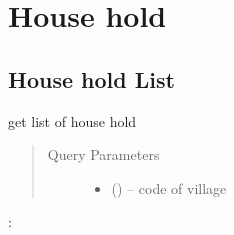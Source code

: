 \documentclass[letterpaper,10pt,english,openany,oneside]{sphinxmanual}
\begin{document}
\section{House hold}
\label{\detokenize{api-last-mile/v1:house-hold}}

\subsection{House hold List}
\label{\detokenize{api-last-mile/v1:house-hold-list}}

\begin{fulllineitems}
\label{\detokenize{api-last-mile/v1:get--api-last-smile-v1-fociHouseHold-list}}
\sphinxAtStartPar
get list of house hold
\begin{quote}\begin{description}
\item[{Query Parameters}] \leavevmode\begin{itemize}
\item {} 
\sphinxAtStartPar
{} () – code of village

\end{itemize}

\end{description}\end{quote}

\sphinxAtStartPar
{}:


\end{fulllineitems}
\end{document}
